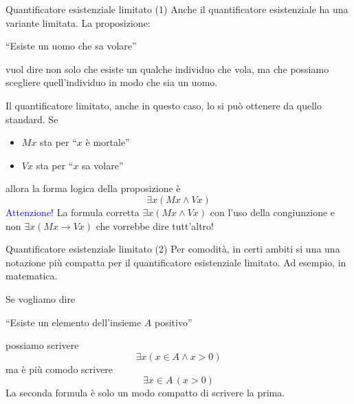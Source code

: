 \documentclass[aspectratio=169,10pt,dvipsnames,xcolor=table]{beamer}
\begin{document}
\begin{frame}{Quantificatore esistenziale limitato (1)}
    Anche il quantificatore esistenziale ha una variante limitata. La proposizione:
    \begin{center}
        ``Esiste un uomo che sa volare''
    \end{center}
    vuol dire non solo che esiste un qualche individuo che vola, ma che possiamo scegliere quell'individuo in modo che sia un uomo.

    \medskip
    Il quantificatore limitato, anche in questo caso, lo si può ottenere da quello standard. Se
    \begin{itemize}
        \item $Mx$ sta per ``$x$ è mortale''
        \item $Vx$ sta per ``$x$ sa volare''
    \end{itemize}
    allora la forma logica della proposizione è
    \[
        \exists x (Mx \wedge Vx)
    \]
    \textcolor{Blue}{Attenzione!} La formula corretta $\exists x (Mx \land Vx)$ con l'uso della \alert{congiunzione} e non  $\exists x (Mx \to Vx)$ che vorrebbe dire tutt'altro!
\end{frame}

\begin{frame}{Quantificatore esistenziale limitato (2)}
    Per comodità, in certi ambiti si una una notazione più compatta per il quantificatore esistenziale limitato. Ad esempio, in matematica.
    \begin{example}
        Se vogliamo dire
        \begin{center}
            ``Esiste un elemento dell'insieme $A$ positivo''
        \end{center}
        possiamo scrivere
        \[
            \exists x (x \in A \wedge x > 0)
        \]
        ma è più comodo scrivere
        \[
            \exists x \in A \, (x > 0)
        \]
        La seconda formula è solo un modo compatto di scrivere la prima.
    \end{example}
\end{frame}
\end{document}
